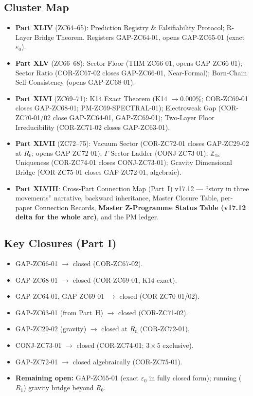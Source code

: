 \documentclass[11pt, a4paper]{article}
\begin{document}
\subsection*{Cluster Map}

\begin{itemize}
  \item \textbf{Part XLIV} (ZC64--65): Prediction Registry \&
    Falsifiability Protocol; R-Layer Bridge Theorem. Registers
    GAP-ZC64-01, opens GAP-ZC65-01 (exact $\varepsilon_0$).
  \item \textbf{Part XLV} (ZC66--68): Sector Floor (THM-ZC66-01,
    opens GAP-ZC66-01); Sector Ratio (COR-ZC67-02 closes GAP-ZC66-01,
    Near-Formal); Born-Chain Self-Consistency (opens GAP-ZC68-01).
  \item \textbf{Part XLVI} (ZC69--71): K14 Exact Theorem (K14 $\to
    0.000\%$; COR-ZC69-01 closes GAP-ZC68-01; PM-ZC69-SPECTRAL-01);
    Electroweak Gap (COR-ZC70-01/02 close GAP-ZC64-01, GAP-ZC69-01);
    Two-Layer Floor Irreducibility (COR-ZC71-02 closes GAP-ZC63-01).
  \item \textbf{Part XLVII} (ZC72--75): Vacuum Sector (COR-ZC72-01
    closes GAP-ZC29-02 at $R_0$; opens GAP-ZC72-01); $\Gamma$-Sector
    Ladder (CONJ-ZC73-01); $\mathbb{Z}_{15}$ Uniqueness (COR-ZC74-01
    closes CONJ-ZC73-01); Gravity Dimensional Bridge (COR-ZC75-01
    closes GAP-ZC72-01, algebraic).
  \item \textbf{Part XLVIII}: Cross-Part Connection Map (Part~I)
    v17.12 --- ``story in three movements'' narrative, backward
    inheritance, Master Closure Table, per-paper Connection Records,
    \textbf{Master Z-Programme Status Table (v17.12 delta for the whole
    arc)}, and the PM ledger.
\end{itemize}

\subsection*{Key Closures (Part I)}

\begin{itemize}
  \item GAP-ZC66-01 $\to$ closed (COR-ZC67-02).
  \item GAP-ZC68-01 $\to$ closed (COR-ZC69-01, K14 exact).
  \item GAP-ZC64-01, GAP-ZC69-01 $\to$ closed (COR-ZC70-01/02).
  \item GAP-ZC63-01 (from Part~H) $\to$ closed (COR-ZC71-02).
  \item GAP-ZC29-02 (gravity) $\to$ closed at $R_0$ (COR-ZC72-01).
  \item CONJ-ZC73-01 $\to$ closed (COR-ZC74-01; $3\times5$ exclusive).
  \item GAP-ZC72-01 $\to$ closed algebraically (COR-ZC75-01).
  \item \textbf{Remaining open:} GAP-ZC65-01 (exact $\varepsilon_0$
    in fully closed form); running ($R_1$) gravity bridge beyond $R_0$.
\end{itemize}
\end{document}
